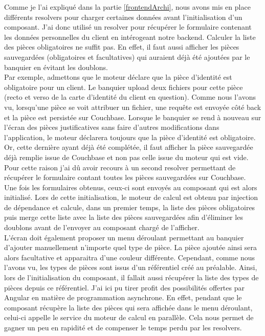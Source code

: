 	Comme je l'ai expliqué dans la partie \ref{frontendArchi}, nous avons mis en place différents resolvers pour charger certaines données avant l'initialisation d'un composant. J'ai donc utilisé un resolver pour récupérer le formulaire contenant les données personnelles du client en intérogeant notre backend. Calculer la liste des pièces obligatoires ne suffit pas. En effet, il faut aussi afficher les pièces sauvegardées (obligatoires et facultatives) qui auraient déjà été ajoutées par le banquier en évitant les doublons. \\
	
	Par exemple, admettons que le moteur déclare que la pièce d'identité est obligatoire pour un client. Le banquier upload deux fichiers pour cette pièce (recto et verso de la carte d'identité du client en question). Comme nous l'avons vu, lorsqu'une pièce se voit attribuer un fichier, une requête est envoyée côté back et la pièce est persistée sur Couchbase. Lorsque le banquier se rend à nouveau sur l'écran des pièces justificatives sans faire d'autres modifications dans l'application, le moteur déclarera toujours que la pièce d'identité est obligatoire. Or, cette dernière ayant déjà été complétée, il faut afficher la pièce sauvegardée déjà remplie issue de Couchbase et non pas celle issue du moteur qui est vide. Pour cette raison j'ai dû avoir recours à un second resolver permettant de récupérer le formulaire contant toutes les pièces sauvegardées sur Couchbase. \\
	
	Une fois les formulaires obtenus, ceux-ci sont envoyés au composant qui est alors initialisé. Lors de cette initialisation, le moteur de calcul est obtenu par injection de dépendance et calcule, dans un premier temps, la liste des pièces obligatoires puis merge cette liste avec la liste des pièces sauvegardées afin d'éliminer les doublons avant de l'envoyer au composant chargé de l'afficher. \\
	
	L'écran doit également proposer un menu déroulant permettant au banquier d'ajouter manuellement n'importe quel type de pièce. La pièce ajoutée ainsi sera alors facultative et apparaitra d'une couleur différente. Cependant, comme nous l'avons vu, les types de pièces sont issus d'un référentiel créé au préalable. Ainsi, lors de l'initialisation du composant, il fallait aussi récupérer la liste des types de pièces depuis ce référentiel. J'ai ici pu tirer profit des possibilités offertes par Angular en matière de programmation asynchrone. En effet, pendant que le composant récupère la liste des pièces qui sera affichée dans le menu déroulant, celui-ci appelle le service du moteur de calcul en parallèle. Cela nous permet de gagner un peu en rapidité et de compenser le temps perdu par les resolvers.

